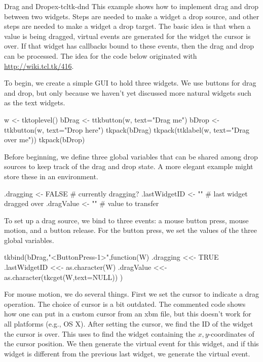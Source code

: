 \begin{example}{Drag and Drop}{ex-tcltk-dnd}
This example shows how to implement drag and drop between two widgets. Steps are needed to make a widget a drop source, and other steps are needed to make a widget a drop target. The basic idea is that when a value is being dragged, virtual events are generated for the widget the cursor is over. If that widget has callbacks bound to these events, then the drag and drop can be processed. The idea for the code below originated with \url{http://wiki.tcl.tk/416}.


To begin, we create a simple GUI to hold three widgets. We use buttons
for drag and drop, but only because we haven't yet discussed more
natural widgets such as the text widgets. 

\begin{Schunk}
\begin{Sinput}
 w <- tktoplevel()
 bDrag <- ttkbutton(w, text="Drag me")
 bDrop <- ttkbutton(w, text="Drop here")
 tkpack(bDrag)
 tkpack(ttklabel(w, text="Drag over me"))
 tkpack(bDrop)
\end{Sinput}
\end{Schunk}


Before beginning, we define three global variables that can be shared
among drop sources to keep track of the drag and drop state. A more
elegant example might store these in an environment.
\begin{Schunk}
\begin{Sinput}
 .dragging <- FALSE                      # currently dragging?
 .lastWidgetID <- ""                     # last widget dragged over
 .dragValue <- ""                        # value to transfer
\end{Sinput}
\end{Schunk}


To set up a drag source, we bind to three events: a mouse button press, mouse motion, and a button release. For the button press, we set the values of the three global variables.
\begin{Schunk}
\begin{Sinput}
 tkbind(bDrag,"<ButtonPress-1>",function(W) {
   .dragging <<-  TRUE
   .lastWidgetID <<- as.character(W)
   .dragValue <<- as.character(tkcget(W,text=NULL))
 })
\end{Sinput}
\end{Schunk}


For mouse motion, we do several things. First we set the cursor to
indicate a drag operation. The choice of cursor is a bit outdated. The
commented code shows how one can put in a custom cursor from an xbm
file, but this doesn't work for all platforms (e.g.,  OS X). After setting the cursor, we find the ID of the widget the cursor is over. This uses  to find the widget containing the $x,y$-coordinates of the cursor position.  We then generate the  virtual event for this widget, and if this widget is different from the previous last widget, we generate the  virtual event.


\end{example}
